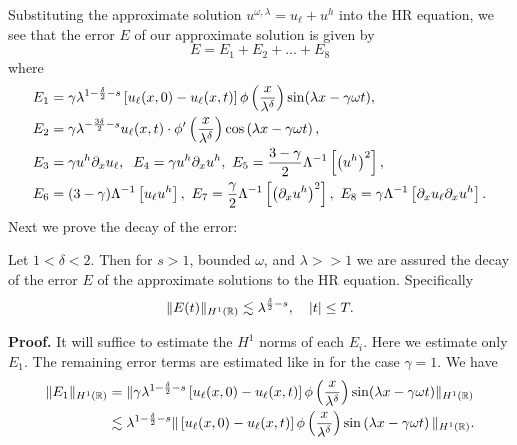 Substituting the
approximate solution $u^{\omega, \lambda} = u_\ell + u^h$ into the HR
equation, we see that the error
$E$ of our approximate solution is given by
%
%
\begin{equation*}
E=E_1 + E_2 + \dots + E_8
\end{equation*}
%
%
where
%
%
\begin{equation}
\label{all_errors_together}
\begin{split}
E_1 & = \gamma \lambda^{1 -\frac{\delta}{2}-s}  \left[ u_\ell(x,0) - u_\ell(x,t)
\right] \phi\left(
\frac{x}{\lambda^ \delta}
\right)\sin(\lambda x - \gamma \omega t),
\\
E_2 & = \gamma \lambda^{-\frac{3\delta}{2}-s}
u_\ell(x,t) \cdot \phi'\left( \frac{x}{\lambda^\delta} \right)\cos\left( \lambda
x - \gamma \omega t
\right),
\\
E_3 & = \gamma u^h \p_x u_\ell, \; \; E_4 = \gamma u^h \p_x u^h, \ E_5  = 
\frac{3-\gamma}{2} \Lambda^{-1} \left[  \left( u^h \right)^2 \right], \\
E_6 & = (3- \gamma)\Lambda^{-1}
\left[ u_\ell u^h \right], \  E_7 = \frac{\gamma}{2} \Lambda^{-1} \left[ 
\left(
\p_x u^h \right)^2 \right ], \ E_8 = \gamma \Lambda^{-1} \left[  \p_x u_\ell \p_x u^h \right].
\end{split}
\end{equation}
%
%
%
Next we prove the decay of the error:
%
%
\begin{proposition}
Let $1<\delta<2$. Then for $s > 1$, bounded $\omega$, and
$\lambda >>1$ we are assured the decay of the error $E$ of the
approximate solutions to the HR equation. Specifically
%
%
%
\begin{equation}
\label{E-est}
\|E(t)\|_{H^1(\mathbb{R})} \lesssim \lambda^{\frac{\delta}{2} -s}, \quad |t| \le 
T.
\end{equation}
%
%
%
\end{proposition}
%
%
%
\textbf{Proof.}
It will suffice to estimate the $H^1$ norms of each $E_i$.
Here we estimate only $E_1$. 
The remaining error terms are estimated 
like in \cite{Himonas:2009fk} for the case $\gamma=1$.
We have
%
%
\begin{equation}
\label{fw-est}
\begin{split}
\|E_1\|_{H^1(\mathbb{R})}
& = \| \gamma \lambda^{1 -\frac{\delta}{2}-s} \left[ u_\ell(x,0) - u_\ell(x,t) \right]
\phi\left( \frac{x}{\lambda^\delta}
\right ) \sin (\lambda x - \gamma \omega t )\|_{H^1(\mathbb{R})}
\\
& \lesssim \lambda^{1 -\frac{\delta}{2} -s } \|\left[ u_\ell(x,0) - 
u_\ell(x,t)
\right] \phi\left( \frac{x}{\lambda^\delta} \right )
\sin\left( \lambda x - \gamma \omega t
\right) \|_{H^1(\mathbb{R})}.
\end{split}
\end{equation}
